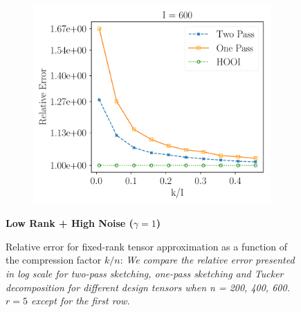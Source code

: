 \begin{figure}[H]
\begin{subfigure}{0.32\textwidth}
    \includegraphics[scale = 0.3]{figure/lk_hnoise_n600.pdf}
    \end{subfigure}
\textbf{Low Rank + High Noise ($\gamma = 1$)} \\ 

\caption{Relative error for fixed-rank tensor approximation as a function of the compression factor $k/n$: \textit{We compare the relative error presented in log scale for two-pass sketching, one-pass sketching and Tucker decomposition for different design tensors when n = 200, 400, 600. $r = 5$ except for the first row.}} \label{fig:more_result}
\end{figure}

